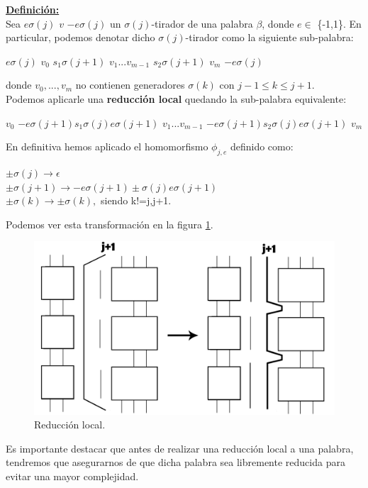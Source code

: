 \documentclass[14pt]{extarticle}
\begin{document}
\underline{\textbf{ Definición:}}\\
Sea $ e \sigma(j)$ $v$ $-e \sigma(j) $ un $\sigma(j)$-tirador de una palabra $\beta$, donde $e \in$ \{-1,1\}. En particular, podemos denotar dicho $\sigma(j)$-tirador como la siguiente sub-palabra:
\begin{center}
	$ e \sigma(j) $ $ v_{0} $ $s_{1} \sigma(j+1) $ $ v_{1}...v_{m-1} $ $s_{2} \sigma(j+1) $ $ v_{m} $ $ -e \sigma(j) $
\end{center} donde $v_{0},...,v_{m}$ no contienen generadores $\sigma(k)$ con $ j-1 \le k \le j+1 $.\\
Podemos aplicarle una \textbf{reducción local} quedando la sub-palabra equivalente:
\begin{center}
 $ v_{0} $ $-e \sigma(j+1) s_{1} \sigma(j) e \sigma(j+1)$ $ v_{1}...v_{m-1} $ $-e \sigma(j+1) s_{2} \sigma(j) e \sigma(j+1)$ $ v_{m} $
\end{center}
En definitiva hemos aplicado el homomorfismo $\phi_{j,e}$ definido como:\\
\begin{center}
	$\pm \sigma(j) \rightarrow \epsilon$\\
	$\pm \sigma(j+1) \rightarrow -e \sigma(j+1) \pm \sigma(j) e \sigma(j+1)$\\
	$\pm \sigma(k) \rightarrow \pm \sigma(k),$ siendo k!=j,j+1.\\
\end{center}

Podemos ver esta transformación en la figura \ref{h3}.\\
\begin{figure}[h!]
	\centering
	\includegraphics[width=12cm]{itrenzas/h14.png}
	\caption{Reducción local.}
	\label{h3} 
\end{figure}

Es importante destacar que antes de realizar una reducción local a una palabra, tendremos que asegurarnos de que dicha palabra sea libremente reducida para evitar una mayor complejidad.\\
\end{document}
